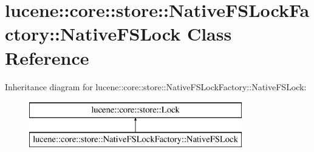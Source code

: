 \hypertarget{classlucene_1_1core_1_1store_1_1NativeFSLockFactory_1_1NativeFSLock}{}\section{lucene\+:\+:core\+:\+:store\+:\+:Native\+F\+S\+Lock\+Factory\+:\+:Native\+F\+S\+Lock Class Reference}
\label{classlucene_1_1core_1_1store_1_1NativeFSLockFactory_1_1NativeFSLock}
Inheritance diagram for lucene\+:\+:core\+:\+:store\+:\+:Native\+F\+S\+Lock\+Factory\+:\+:Native\+F\+S\+Lock\+:\begin{figure}[H]
\begin{center}
\leavevmode
\includegraphics[height=2.000000cm]{classlucene_1_1core_1_1store_1_1NativeFSLockFactory_1_1NativeFSLock}
\end{center}
\end{figure}
